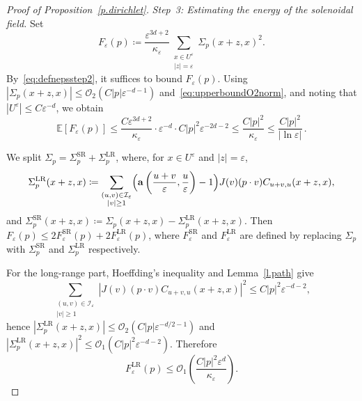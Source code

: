 \documentclass[11pt]{amsart}
\theoremstyle{plain}
\theoremstyle{definition}
\theoremstyle{remark}
\newcommand{\E}{\mathbb{E}}
\renewcommand{\a}{\mathbf{a}}
\newcommand{\eps}{\varepsilon}
\begin{document}
\begin{proof}[Proof of Proposition~\ref{p.dirichlet}]
		\medskip
		
		\emph{Step~3: Estimating the energy of the solenoidal field.}
		Set
		\[
		F_\eps(p) \coloneqq \frac{\eps^{3d+2}}{\kappa_\eps} \sum_{\substack{x \in U^\eps \\ |z| = \eps}} \Sigma_p(x+z,x)^2.
		\]
		By~\eqref{eq:defnepsstep2}, it suffices to bound $F_\eps(p)$.
		Using $|\Sigma_p(x+z,x)| \le \mathcal{O}_2(C|p|\eps^{-d-1})$ and~\eqref{eq:upperboundO2norm}, and noting that $|U^\eps| \le C\eps^{-d}$, we obtain %
		\begin{equation} \label{eq:expectationF}
			\E[F_\eps(p)] \le \frac{C\eps^{3d+2}}{\kappa_\eps} \cdot \eps^{-d} \cdot C|p|^2\eps^{-2d-2} \le \frac{C|p|^2}{\kappa_\eps} \le \frac{C|p|^2}{|\ln\eps|}\,.
		\end{equation}
		
		We split $\Sigma_p = \Sigma_p^{\mathrm{SR}} + \Sigma_p^{\mathrm{LR}}$, where, for $x \in U^\eps$ and $|z| = \eps$,
		\[
		\Sigma_p^{\mathrm{LR}}(x+z,x) \coloneqq \sum_{\substack{(u,v) \in \mathcal{I}_\eps \\ |v| \ge 1}} \Bigl(\a\left(\frac{u+v}{\eps},\frac{u}{\eps}\right) - 1\Bigr) J(v)(p \cdot v) C_{u+v,u}(x+z,x),
		\]
		and $\Sigma_p^{\mathrm{SR}}(x+z,x) \coloneqq \Sigma_p(x+z,x) - \Sigma_p^{\mathrm{LR}}(x+z,x)$.
		Then $F_\eps(p) \le 2 F_\eps^{\mathrm{SR}}(p) + 2 F_\eps^{\mathrm{LR}}(p)$, where $F_\eps^{\mathrm{SR}}$ and $F_\eps^{\mathrm{LR}}$ are defined by replacing $\Sigma_p$ with $\Sigma_p^{\mathrm{SR}}$ and $\Sigma_p^{\mathrm{LR}}$ respectively.
		
		For the long-range part, Hoeffding's inequality and Lemma~\ref{l.path} give
		\[
		\sum_{\substack{(u,v) \in \mathcal{I}_\eps \\ |v| \ge 1}} |J(v)(p \cdot v) C_{u+v,u}(x+z,x)|^2 \le C|p|^2\eps^{-d-2},
		\]
		hence $|\Sigma_p^{\mathrm{LR}}(x+z,x)| \le \mathcal{O}_2(C|p|\eps^{-d/2-1})$ and $|\Sigma_p^{\mathrm{LR}}(x+z,x)|^2 \le \mathcal{O}_1(C|p|^2\eps^{-d-2})$.
		Therefore
		\begin{equation} \label{eq:estimateLRterm}
			F_\eps^{\mathrm{LR}}(p) \le \mathcal{O}_1\left(\frac{C|p|^2\eps^d}{\kappa_\eps}\right).
		\end{equation}
		

\end{proof}
\end{document}

